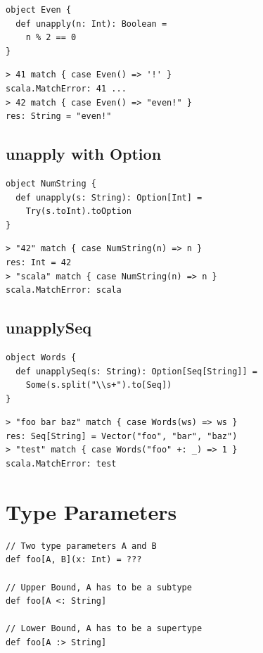 \documentclass[10pt,landscape,a4paper]{article}
\begin{document}
\begin{multicols*}{4}
\begin{verbatim}
object Even {
  def unapply(n: Int): Boolean =
    n % 2 == 0
}
\end{verbatim}

\begin{verbatim}
> 41 match { case Even() => '!' }
scala.MatchError: 41 ...
> 42 match { case Even() => "even!" }
res: String = "even!"
\end{verbatim}

  \subsection{unapply with Option}

\begin{verbatim}
object NumString {
  def unapply(s: String): Option[Int] =
    Try(s.toInt).toOption
}
\end{verbatim}

\begin{verbatim}
> "42" match { case NumString(n) => n }
res: Int = 42
> "scala" match { case NumString(n) => n }
scala.MatchError: scala
\end{verbatim}

  \subsection{unapplySeq}

\begin{verbatim}
object Words {
  def unapplySeq(s: String): Option[Seq[String]] =
    Some(s.split("\\s+").to[Seq])
}
\end{verbatim}

\begin{verbatim}
> "foo bar baz" match { case Words(ws) => ws }
res: Seq[String] = Vector("foo", "bar", "baz")
> "test" match { case Words("foo" +: _) => 1 }
scala.MatchError: test
\end{verbatim}

  \section{Type Parameters}

\begin{verbatim}
// Two type parameters A and B
def foo[A, B](x: Int) = ???

// Upper Bound, A has to be a subtype
def foo[A <: String]

// Lower Bound, A has to be a supertype
def foo[A :> String]


\end{verbatim}
\end{multicols*}
\end{document}
